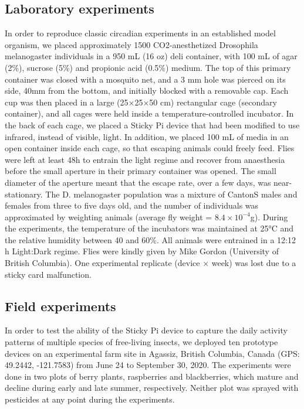 \documentclass[fleqn,10pt]{wlscirep}
\begin{document}
\subsection*{Laboratory experiments}
In order to reproduce classic circadian experiments in an established model organism, we placed approximately 1500 CO2-anesthetized Drosophila melanogaster individuals in a 950 mL (16 oz) deli container, with 100 mL of agar (2\%), sucrose (5\%) and propionic acid (0.5\%) medium. The top of this primary container was closed with a mosquito net, and a 3 mm hole was pierced on its side, 40mm from the bottom, and initially blocked with a removable cap. Each cup was then placed in a large (25×25×50 cm) rectangular cage (secondary container), and all cages were held inside a temperature-controlled incubator. In the back of each cage, we placed a Sticky Pi device that had been modified to use infrared, instead of visible, light. In addition, we placed 100 mL of media in an open container inside each cage, so that escaping animals could freely feed. Flies were left at least 48h to entrain the light regime and recover from anaesthesia before the small aperture in their primary container was opened. The small diameter of the aperture meant that the escape rate, over a few days, was near-stationary.
The D. melanogaster population was a mixture of CantonS males and females from three to five days old, and the number of individuals was approximated by weighting animals (average fly weight = $8.4×10^{-4}$g). During the experiments, the temperature of the incubators was maintained at 25°C and the relative humidity between 40 and 60\%. All animals were entrained in a 12:12 h Light:Dark regime. Flies were kindly given by Mike Gordon (University of British Columbia). One experimental replicate (device × week) was lost due to a sticky card malfunction.

\subsection*{Field experiments}
In order to test the ability of the Sticky Pi device to capture the daily activity patterns of multiple species of free-living insects, we deployed ten prototype devices on an experimental farm site in Agassiz, British Columbia, Canada (GPS: 49.2442, -121.7583) from June 24 to September 30, 2020. The experiments were done in two plots of berry plants, raspberries and blackberries, which mature and decline during early and late summer, respectively. Neither plot was sprayed with pesticides at any point during the experiments.
\end{document}
